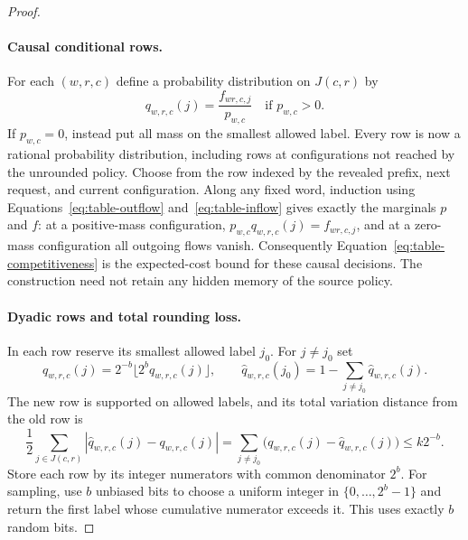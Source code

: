 \begin{proof}
\paragraph{Causal conditional rows.}
For each $(w,r,c)$ define a probability distribution on $J(c,r)$ by
\begin{equation}\label{eq:table-conditional}
 q_{w,r,c}(j)=\frac{f_{wr,c,j}}{p_{w,c}}
 \quad\text{if }p_{w,c}>0.
\end{equation}
If $p_{w,c}=0$, instead put all mass on the smallest allowed label.
Every row is now a rational probability distribution, including rows
at configurations not reached by the unrounded policy. Choose from
the row indexed by the revealed prefix, next request, and current
configuration. Along any fixed word, induction using
Equations~\eqref{eq:table-outflow} and~\eqref{eq:table-inflow} gives
exactly the marginals $p$ and $f$: at a positive-mass configuration,
$p_{w,c}q_{w,r,c}(j)=f_{wr,c,j}$, and at a zero-mass configuration all
outgoing flows vanish. Consequently Equation~\eqref{eq:table-competitiveness}
is the expected-cost bound for these causal decisions. The construction
need not retain any hidden memory of the source policy.

\paragraph{Dyadic rows and total rounding loss.}
In each row reserve its smallest allowed label $j_0$. For $j\ne j_0$
set
\[
 \widehat q_{w,r,c}(j)=2^{-b}\lfloor 2^bq_{w,r,c}(j)\rfloor,
 \qquad
 \widehat q_{w,r,c}(j_0)=1-\sum_{j\ne j_0}\widehat q_{w,r,c}(j).
\]
The new row is supported on allowed labels, and its total variation
distance from the old row is
\[
 \frac12\sum_{j\in J(c,r)}
        |\widehat q_{w,r,c}(j)-q_{w,r,c}(j)|
 =\sum_{j\ne j_0}\bigl(q_{w,r,c}(j)-\widehat q_{w,r,c}(j)\bigr)
 \le k2^{-b}.
\]
Store each row by its integer numerators with common denominator $2^b$.
For sampling, use $b$ unbiased bits to choose a uniform integer in
$\{0,\ldots,2^b-1\}$ and return the first label whose cumulative
numerator exceeds it. This uses exactly $b$ random bits.


\end{proof}
